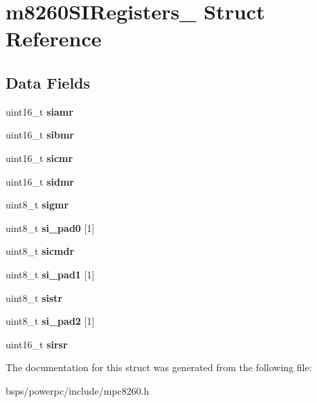 \hypertarget{structm8260SIRegisters__}{}\section{m8260\+S\+I\+Registers\+\_\+ Struct Reference}
\label{structm8260SIRegisters__}
\subsection*{Data Fields}
\begin{DoxyCompactItemize}
\item 
\mbox{\label{structm8260SIRegisters___a6b987ca719a07fc0c6a8352fee8976cc}} 
uint16\+\_\+t {\bfseries siamr}
\item 
\mbox{\label{structm8260SIRegisters___ab235488a32b622c9eec4967779247719}} 
uint16\+\_\+t {\bfseries sibmr}
\item 
\mbox{\label{structm8260SIRegisters___aafd236fe21ec4183ea14b8e8bd046b47}} 
uint16\+\_\+t {\bfseries sicmr}
\item 
\mbox{\label{structm8260SIRegisters___a8a63f471bb9536e296d0e8de46b5e8cb}} 
uint16\+\_\+t {\bfseries sidmr}
\item 
\mbox{\label{structm8260SIRegisters___a630a7d6acf063aa468d34432c0355149}} 
uint8\+\_\+t {\bfseries sigmr}
\item 
\mbox{\label{structm8260SIRegisters___a3857bd173f713f9c310c32c54a7fc009}} 
uint8\+\_\+t {\bfseries si\+\_\+pad0} \mbox{[}1\mbox{]}
\item 
\mbox{\label{structm8260SIRegisters___abb1018ac46e3ca33fd0493e0ef139e83}} 
uint8\+\_\+t {\bfseries sicmdr}
\item 
\mbox{\label{structm8260SIRegisters___a5936a550165206e1bcd2f510bcfc80ea}} 
uint8\+\_\+t {\bfseries si\+\_\+pad1} \mbox{[}1\mbox{]}
\item 
\mbox{\label{structm8260SIRegisters___a80379f900f14b9c644d4a6c43d4e0da8}} 
uint8\+\_\+t {\bfseries sistr}
\item 
\mbox{\label{structm8260SIRegisters___adc8bebdc6a9152d2a43a0926314d5857}} 
uint8\+\_\+t {\bfseries si\+\_\+pad2} \mbox{[}1\mbox{]}
\item 
\mbox{\label{structm8260SIRegisters___a43feb1330708772c593e372da8dd061f}} 
uint16\+\_\+t {\bfseries sirsr}
\end{DoxyCompactItemize}


The documentation for this struct was generated from the following file\+:\begin{DoxyCompactItemize}
\item 
bsps/powerpc/include/mpc8260.\+h\end{DoxyCompactItemize}
